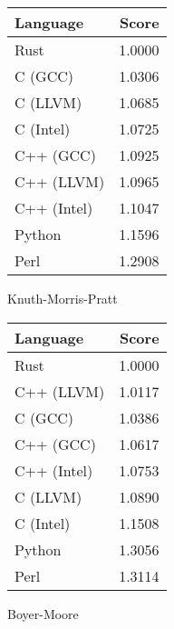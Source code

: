 \begin{subtable}{0.33\textwidth}
    \centering
    \begin{tabular}{|l|r|}
        \hline
        Language & Score \\
        \hline
        Rust & 1.0000 \\
        C (GCC) & 1.0306 \\
        C (LLVM) & 1.0685 \\
        C (Intel) & 1.0725 \\
        C++ (GCC) & 1.0925 \\
        C++ (LLVM) & 1.0965 \\
        C++ (Intel) & 1.1047 \\
        Python & 1.1596 \\
        Perl & 1.2908 \\
        \hline
    \end{tabular}
    \caption{Knuth-Morris-Pratt}
    \label{table:energy:kmp}
\end{subtable}%
\begin{subtable}{0.33\textwidth}
    \centering
    \begin{tabular}{|l|r|}
        \hline
        Language & Score \\
        \hline
        Rust & 1.0000 \\
        C++ (LLVM) & 1.0117 \\
        C (GCC) & 1.0386 \\
        C++ (GCC) & 1.0617 \\
        C++ (Intel) & 1.0753 \\
        C (LLVM) & 1.0890 \\
        C (Intel) & 1.1508 \\
        Python & 1.3056 \\
        Perl & 1.3114 \\
        \hline
    \end{tabular}
    \caption{Boyer-Moore}
    \label{table:energy:boyer_moore}
\end{subtable}%
